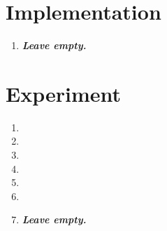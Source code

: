 \documentclass{article}
\begin{document}
\section{Implementation}

\begin{enumerate}[label=\alph*.,leftmargin=*]
    \item \textbf{\textit{Leave empty.}}
\end{enumerate}

\section{Experiment}

\begin{enumerate}[label=\alph*.,leftmargin=*]
    \item
    \item
    \item
    \item
    \item
    \item
    \item \textbf{\textit{Leave empty.}}
\end{enumerate}

\end{document}
